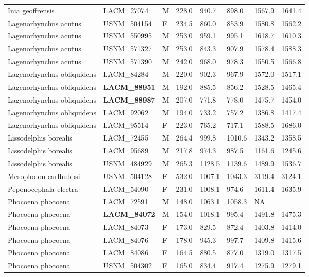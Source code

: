 \begin{longtable}{|p{1.95in}p{1.1in}p{.15in}p{.4in}p{.4in}p{.4in}p{.4in}p{.4in}|}
  Inia geoffrensis & LACM\_27074 & M & 228.0 & 940.7 & 898.0 & 1567.9 & 1641.4 \\ 
  Lagenorhynchus acutus & USNM\_504154 & F & 234.5 & 860.0 & 853.9 & 1580.8 & 1562.2 \\ 
  Lagenorhynchus acutus & USNM\_550995 & M & 253.0 & 959.1 & 995.1 & 1618.7 & 1610.3 \\ 
  Lagenorhynchus acutus & USNM\_571327 & M & 253.0 & 843.3 & 907.9 & 1578.4 & 1588.3 \\ 
  Lagenorhynchus acutus & USNM\_571390 & M & 242.0 & 968.0 & 978.3 & 1550.5 & 1566.8 \\ 
  Lagenorhynchus obliquidens & LACM\_84284 & M & 220.0 & 902.3 & 967.9 & 1572.0 & 1517.1 \\ 
  Lagenorhynchus obliquidens & \textbf{ LACM\_88951 } & M & 192.0 & 885.5 & 856.2 & 1528.5 & 1465.4 \\ 
  Lagenorhynchus obliquidens & \textbf{ LACM\_88987 } & M & 207.0 & 771.8 & 778.0 & 1475.7 & 1454.0 \\ 
  Lagenorhynchus obliquidens & LACM\_92062 & M & 194.0 & 733.2 & 757.2 & 1386.8 & 1417.4 \\ 
  Lagenorhynchus obliquidens & LACM\_95514 & F & 223.0 & 765.2 & 717.1 & 1588.5 & 1686.0 \\ 
  Lissodelphis borealis & LACM\_72455 & M & 264.4 & 999.8 & 1010.6 & 1343.2 & 1358.5 \\ 
  Lissodelphis borealis & LACM\_95689 & M & 217.8 & 974.3 & 987.5 & 1161.6 & 1245.6 \\ 
  Lissodelphis borealis & USNM\_484929 & M & 265.3 & 1128.5 & 1139.6 & 1489.9 & 1536.7 \\ 
  Mesoplodon carlhubbsi & USNM\_504128 & F & 532.0 & 1007.1 & 1043.3 & 3119.4 & 3124.1 \\ 
  Peponocephala electra & LACM\_54090 & F & 231.0 & 1008.1 & 974.6 & 1611.4 & 1635.9 \\ 
  Phocoena phocoena & LACM\_72591 & M & 148.0 & 1063.1 & 1058.3 & NA &  \\ 
  Phocoena phocoena & \textbf{ LACM\_84072 } & M & 154.0 & 1018.1 & 995.4 & 1491.8 & 1475.3 \\ 
  Phocoena phocoena & LACM\_84073 & F & 173.0 & 829.5 & 872.4 & 1403.8 & 1414.0 \\ 
  Phocoena phocoena & LACM\_84076 & F & 178.0 & 945.3 & 997.7 & 1409.8 & 1415.6 \\ 
  Phocoena phocoena & LACM\_84086 & F & 164.5 & 880.5 & 877.0 & 1319.0 & 1317.5 \\ 
  Phocoena phocoena & USNM\_504302 & F & 165.0 & 834.4 & 917.4 & 1275.9 & 1279.1 \\ 

\end{longtable}
